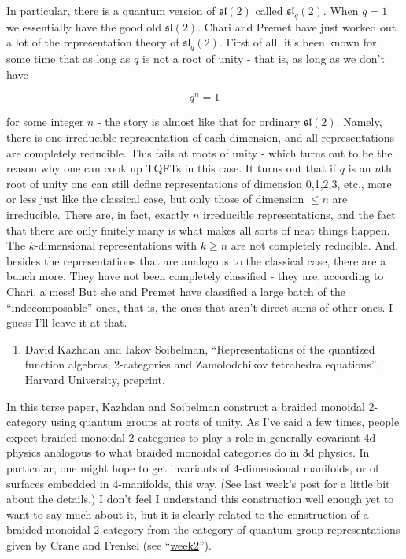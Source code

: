 \documentclass{article}
\def\tightlist{}
\begin{document}
In particular, there is a quantum version of \(\mathfrak{sl}(2)\) called
\(\mathfrak{sl}_q(2)\). When \(q = 1\) we essentially have the good old
\(\mathfrak{sl}(2)\). Chari and Premet have just worked out a lot of the
representation theory of \(\mathfrak{sl}_q(2)\). First of all, it's been
known for some time that as long as \(q\) is not a root of unity - that
is, as long as we don't have

\[q^n = 1\]

for some integer \(n\) - the story is almost like that for ordinary
\(\mathfrak{sl}(2)\). Namely, there is one irreducible representation of
each dimension, and all representations are completely reducible. This
fails at roots of unity - which turns out to be the reason why one can
cook up TQFTs in this case. It turns out that if \(q\) is an \(n\)th
root of unity one can still define representations of dimension 0,1,2,3,
etc., more or less just like the classical case, but only those of
dimension \(\leqslant n\) are irreducible. There are, in fact, exactly
\(n\) irreducible representations, and the fact that there are only
finitely many is what makes all sorts of neat things happen. The
\(k\)-dimensional representations with \(k \geqslant n\) are not
completely reducible. And, besides the representations that are
analogous to the classical case, there are a bunch more. They have not
been completely classified - they are, according to Chari, a mess! But
she and Premet have classified a large batch of the ``indecomposable''
ones, that is, the ones that aren't direct sums of other ones. I guess
I'll leave it at that.

\begin{enumerate}
\def\labelenumi{\arabic{enumi})}
\setcounter{enumi}{1}
\tightlist
\item
  David Kazhdan and Iakov Soibelman, ``Representations of the quantized
  function algebras, 2-categories and Zamolodchikov tetrahedra
  equations'', Harvard University, preprint.
\end{enumerate}

In this terse paper, Kazhdan and Soibelman construct a braided monoidal
2-category using quantum groups at roots of unity. As I've said a few
times, people expect braided monoidal 2-categories to play a role in
generally covariant 4d physics analogous to what braided monoidal
categories do in 3d physics. In particular, one might hope to get
invariants of 4-dimensional manifolds, or of surfaces embedded in
4-manifolds, this way. (See last week's post for a little bit about the
details.) I don't feel I understand this construction well enough yet to
want to say much about it, but it is clearly related to the construction
of a braided monoidal 2-category from the category of quantum group
representations given by Crane and Frenkel (see
``\href{week2.html}{week2}'').
\end{document}
